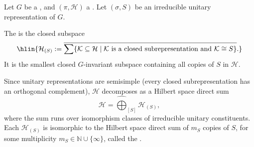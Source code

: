 \begin{definition} \label{definition:isotypic_component_of_a_continuous_representation_of_a_topological_group_on_a_hilbert_space_for_an_irreducible_representation}

    Let $G$ be a , and $(\pi, \mathcal{H})$ a . Let $(\sigma, S)$ be an irreducible unitary representation of $G$.

    The  is the closed subspace
    $$\hlin{\mathcal{H}_{(S)} := \overline{\sum \{\mathcal{K} \subseteq \mathcal{H} \mid \mathcal{K} \text{ is a closed subrepresentation and } \mathcal{K} \cong S\}}.}$$
    It is the smallest closed $G$-invariant subspace containing all copies of $S$ in $\mathcal{H}$.

    Since unitary representations are semisimple (every closed subrepresentation has an orthogonal complement), $\mathcal{H}$ decomposes as a Hilbert space direct sum
    $$ \mathcal{H} = \widehat{\bigoplus}_{[S]} \mathcal{H}_{(S)},$$
    where the sum runs over isomorphism classes of irreducible unitary constituents. Each $\mathcal{H}_{(S)}$ is isomorphic to the Hilbert space direct sum of $m_S$ copies of $S$, for some multiplicity $m_S \in \mathbb{N} \cup \{\infty\}$, called the .
\end{definition}
